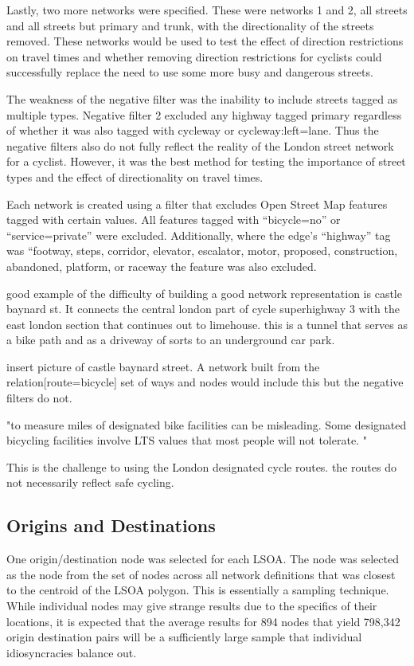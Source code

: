 Lastly, two more networks were specified. These were networks 1 and 2, all streets and all streets but primary and trunk, with the directionality of the streets removed. These networks would be used to test the effect of direction restrictions on travel times and whether removing direction restrictions for cyclists could successfully replace the need to use some more busy and dangerous streets. 

The weakness of the negative filter was the inability to include streets tagged as multiple types. Negative filter 2 excluded any highway tagged primary regardless of whether it was also tagged with cycleway or cycleway:left=lane. Thus the negative filters also do not fully reflect the reality of the London street network for a cyclist. However, it was the best method for testing the importance of street types and the effect of directionality on travel times. 


Each network is created using a filter that excludes Open Street Map features tagged with certain values. All features tagged with ``bicycle=no'' or ``service=private'' were excluded. Additionally, where the edge's ``highway'' tag was ``footway, steps, corridor, elevator, escalator, motor, proposed, construction, abandoned, platform, or raceway the feature was also excluded. 

good example of the difficulty of building a good network representation is castle baynard st. It connects the central london part of cycle superhighway 3 with the east london section that continues out to limehouse. this is a tunnel that serves as a bike path and as a driveway of sorts to an underground car park. 

insert picture of castle baynard street. A network built from the relation[route=bicycle] set of ways and nodes would include this but the negative filters do not. 


"to measure miles of designated bike facilities can be misleading. Some designated bicycling facilities involve LTS values that most people will not tolerate. "\cite{furth}

This is the challenge to using the London designated cycle routes. the routes do not necessarily reflect safe cycling. 

\subsection{Origins and Destinations}

One origin/destination node was selected for each LSOA. The node was selected as the node from the set of nodes across all network definitions that was closest to the centroid of the LSOA polygon. This is essentially a sampling technique. While individual nodes may give strange results due to the specifics of their locations, it is expected that the average results for 894 nodes that yield 798,342 origin destination pairs will be a sufficiently large sample that individual idiosyncracies balance out. 

